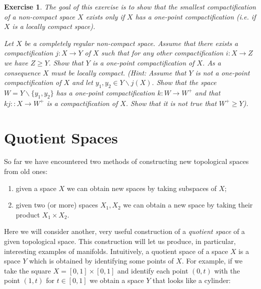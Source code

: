 \documentclass[11pt, letterpaper, oneside]{report}
\renewcommand{\chaptermark}[1]{\markboth{#1}{}}
\theoremstyle{pplain}
\newtheorem{ITERMVALUE THM}[theorem]{Intermediate Value Theorem}
\newtheorem{HEINEBOREL THM}[theorem]{Heine-Borel Theorem}
\newtheorem{UMETR THM}[theorem]{Urysohn Metrization Theorem}
\newtheorem{UMETR2 THM}[theorem]{Urysohn Metrization Theorem (v.2)}
\theoremstyle{ddefinition}
\theoremstyle{nnn}
\newtheorem{TDA NN}[theorem]{Topological Data Analysis. }
\theoremstyle{eexercise}
\newtheorem{exercise}{Exercise}[chapter]
\newcommand{\ssmin}{\smallsetminus}
\newcommand{\benu}{\begin{enumerate}}
\newcommand{\eenu}{\end{enumerate}}
\begin{document}
  
  
\begin{exercise}
\label{SMALLEST COMPACTIFI EXERCISE}
The goal of this exercise is to show that the smallest compactification of a non-compact 
space $X$ exists only if $X$ has a one-point compactification (i.e. if $X$ is a locally compact space). 

Let $X$ be a completely regular non-compact space. 
Assume that  there exists a compactification $j\colon X \to Y$
of $X$ such that for any other compactification $i\colon X \to Z$ we have $Z \geq Y$. Show that 
$Y$ is a one-point compactification of $X$. As a consequence $X$ must be locally compact. 
(Hint: Assume that $Y$ is not a one-point compactification of $X$ and let $y_{1}, y_{2} \in Y\ssmin j(X)$. 
Show that the space $W = Y\ssmin \{y_{1}, y_{2}\}$ has a one-point compactification $k\colon W \to W^{+}$ 
and that  $kj\colon \colon X \to W^{+}$ is a compactification of $X$. Show that  it is not true
that $W^{+} \geq Y$). 
\end{exercise}






\newpage

\chapter{Quotient Spaces}
\chaptermark{Quotient Spaces}

\thispagestyle{firststyle}

So far we have encountered two methods of constructing new topological spaces 
from old ones: 
\benu 
\item[\textbullet] given a space $X$ we can obtain new spaces by taking subspaces of $X$; 
\item[\textbullet] given two (or more) spaces $X_{1}, X_{2}$ we can obtain a new space by taking 
their product $X_{1}\times X_{2}$. 
\eenu

Here we will consider  another, very useful construction of  a \emph{quotient space} 
of a given topological space. This construction will let us produce, in particular,  interesting 
examples of manifolds. Intuitively, a quotient space 
of a space $X$ is a space $Y$ which is obtained by identifying some points of $X$. For example, if we 
take the square $X = [0,1]\times [0,1]$  and identify each point $(0,t)$ with the 
point $(1, t)$ for $t\in [0,1]$ we obtain a space $Y$ that looks like a cylinder:
\end{document}
